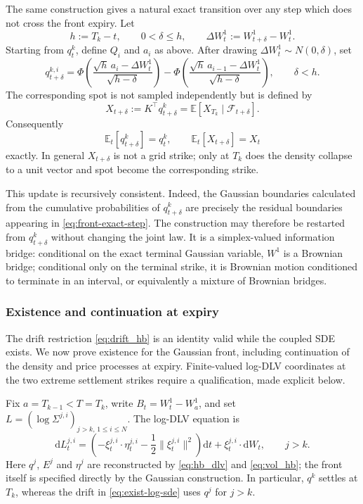 \documentclass[11pt]{article}
\newcommand{\dd}{\mathrm d}
\theoremstyle{plain}
\theoremstyle{definition}
\theoremstyle{remark}
\begin{document}
The same construction gives a natural exact transition over any step which
does not cross the front expiry. Let
\[
h:=T_k-t,
\qquad 0<\delta\leq h,
\qquad \Delta W_t^1:=W_{t+\delta}^1-W_t^1.
\]
Starting from $q_t^k$, define $Q_i$ and $a_i$ as above. After drawing
$\Delta W_t^1\sim N(0,\delta)$, set
\begin{equation}
\label{eq:front-exact-step}
q_{t+\delta}^{k,i}
=\Phi\!\left(
\frac{\sqrt h\,a_i-\Delta W_t^1}{\sqrt{h-\delta}}
\right)
-\Phi\!\left(
\frac{\sqrt h\,a_{i-1}-\Delta W_t^1}{\sqrt{h-\delta}}
\right),
\qquad \delta<h.
\end{equation}
The corresponding spot is not sampled independently but is defined by
\begin{equation}
\label{eq:spot-exact-step}
X_{t+\delta}:=K^\top q_{t+\delta}^k
=\mathbb E\!\left[X_{T_k}\mid\mathcal F_{t+\delta}\right].
\end{equation}
Consequently
\[
\mathbb E_t[q_{t+\delta}^k]=q_t^k,
\qquad
\mathbb E_t[X_{t+\delta}]=X_t
\]
exactly. In general $X_{t+\delta}$ is not a grid strike; only at $T_k$ does
the density collapse to a unit vector and spot become the corresponding
strike.

This update is recursively consistent. Indeed, the Gaussian boundaries
calculated from the cumulative probabilities of $q_{t+\delta}^k$ are
precisely the residual boundaries appearing in
\eqref{eq:front-exact-step}. The construction may therefore be restarted
from $q_{t+\delta}^k$ without changing the joint law. It is a
simplex-valued information bridge: conditional on the exact terminal
Gaussian variable, $W^1$ is a Brownian bridge; conditional only on the
terminal strike, it is Brownian motion conditioned to terminate in an
interval, or equivalently a mixture of Brownian bridges.

\subsubsection{Existence and continuation at expiry}
\label{sec:existence}

The drift restriction \eqref{eq:drift_hb} is an identity valid while the
coupled SDE exists. We now prove existence for the Gaussian front, including
continuation of the density and price processes at expiry. Finite-valued
log-DLV coordinates at the two extreme settlement strikes require a
qualification, made explicit below.

Fix $a=T_{k-1}<T=T_k$, write $B_t=W_t^1-W_a^1$, and set
$L=(\log\Sigma^{j,i})_{j>k,\,1\le i\le N}$. The log-DLV equation is
\begin{equation}\label{eq:exist-log-sde}
 \dd L_t^{j,i}
 =\left(-\xi_t^{j,i}\cdot\eta_t^{j,i}
        -\frac12\lVert\xi_t^{j,i}\rVert^2\right)\dd t
    +\xi_t^{j,i}\cdot\dd W_t,
 \qquad j>k.
\end{equation}
Here $q^j$, $E^j$ and $\eta^j$ are reconstructed by
\eqref{eq:hb_dlv} and \eqref{eq:vol_hb}; the front itself is specified
directly by the Gaussian construction. In particular, $q^k$ settles at
$T_k$, whereas the drift in \eqref{eq:exist-log-sde} uses $q^j$ for $j>k$.
\end{document}

